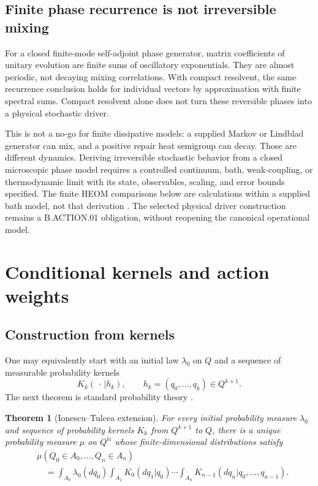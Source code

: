 \documentclass[11pt]{article}
\newtheorem{theorem}{Theorem}[section]
\theoremstyle{definition}
\theoremstyle{remark}
\newcommand{\N}{\mathbb{N}}
\begin{document}
\subsection{Finite phase recurrence is not irreversible mixing}
\label{sec:recurrence-boundary}
For a closed finite-mode self-adjoint phase generator, matrix coefficients
of unitary evolution are finite sums of oscillatory exponentials. They are
almost periodic, not decaying mixing correlations. With compact resolvent,
the same recurrence conclusion holds for individual vectors by approximation
with finite spectral sums. Compact resolvent alone does not turn these
reversible phases into a physical stochastic driver.

This is not a no-go for finite dissipative models: a supplied Markov or
Lindblad generator can mix, and a positive repair heat semigroup can decay.
Those are different dynamics. Deriving irreversible stochastic behavior
from a closed microscopic phase model requires a controlled continuum,
bath, weak-coupling, or thermodynamic limit with its state, observables,
scaling, and error bounds specified. The finite HEOM comparisons below
are calculations within a supplied bath model, not that derivation
\cite{beq04,beq06}. The selected physical driver construction remains a
B.ACTION.01 obligation, without reopening the canonical operational model.

\section{Conditional kernels and action weights}

\subsection{Construction from kernels}

One may equivalently start with an initial law \(\lambda_0\) on \(Q\) and a
sequence of measurable probability kernels
\[
K_k(\,\cdot\,|h_k),\qquad h_k=(q_0,\ldots,q_k)\in Q^{k+1}.
\]
The next theorem is standard probability theory
\cite{kallenberg2002}.

\begin{theorem}[Ionescu--Tulcea extension]\label{thm:IT}
For every initial probability measure \(\lambda_0\) and sequence of probability
kernels \(K_k\) from \(Q^{k+1}\) to \(Q\), there is a unique probability measure
\(\mu\) on \(Q^{\N}\) whose finite-dimensional distributions satisfy
\[
\begin{split}
&\mu(Q_0\in A_0,\ldots,Q_n\in A_n)\\
&\quad =
\int_{A_0}\lambda_0(dq_0)
\int_{A_1}K_0(dq_1|q_0)\cdots
\int_{A_n}K_{n-1}(dq_n|q_0,\ldots,q_{n-1}).
\end{split}
\]
\end{theorem}
\end{document}
